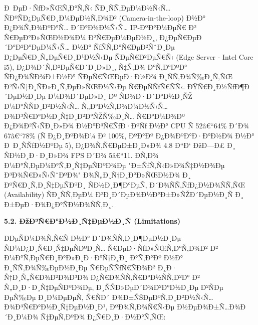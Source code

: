 \documentclass[]{article}
\begin{document}
Ð ÐµÐ·ÑƒÐ»ÑŒÑ‚Ð°Ñ‚Ñ‹ ÑÐ¸ÑÑ‚ÐµÐ¼Ð½Ñ‹Ñ… ÑÐºÑÐ¿ÐµÑ€Ð¸Ð¼ÐµÐ½Ñ‚Ð¾Ð² (Camera-in-the-loop) Ð½Ð° Ð¿Ð¾Ñ‚Ð¾ÐºÐ°Ñ… Ð´Ð°Ð½Ð½Ñ‹Ñ… IP-ÐºÐ°Ð¼ÐµÑ€ Ð² Ñ€ÐµÐ°Ð»ÑŒÐ½Ð¾Ð¼ Ð²Ñ€ÐµÐ¼ÐµÐ½Ð¸, Ð¿ÐµÑ€ÐµÐ´Ð°Ð²Ð°ÐµÐ¼Ñ‹Ñ… Ð½Ð° ÑƒÑÑ‚Ð°Ñ€ÐµÐ²ÑˆÐ¸Ðµ Ð¿ÐµÑ€Ð¸Ñ„ÐµÑ€Ð¸Ð¹Ð½Ñ‹Ðµ ÑÐµÑ€Ð²ÐµÑ€Ñ‹ (Edge Server - Intel Core i5), Ð¿Ð¾Ð´Ñ‚Ð²ÐµÑ€Ð´Ð¸Ð»Ð¸, Ñ‡Ñ‚Ð¾ Ð°Ñ‚Ð°ÐºÐ° ÑÐ¿Ð¾ÑÐ¾Ð±Ð½Ð° ÑÐµÑ€ÑŒÐµÐ·Ð½Ð¾ Ð¸ÑÑ‚Ð¾Ñ‰Ð¸Ñ‚ÑŒ Ð²Ñ‹Ñ‡Ð¸ÑÐ»Ð¸Ñ‚ÐµÐ»ÑŒÐ½Ñ‹Ðµ Ñ€ÐµÑÑƒÑ€ÑÑ‹. ÐŸÑ€Ð¸Ð½ÑƒÐ¶Ð´ÐµÐ½Ð¸Ðµ Ð¼Ð¾Ð´ÐµÐ»Ð¸ Ðº ÑÐ¾Ð·Ð´Ð°Ð½Ð¸ÑŽ Ð¼Ð°ÑÑÐ¸Ð²Ð½Ñ‹Ñ… Ñ„Ð°Ð½Ñ‚Ð¾Ð¼Ð½Ñ‹Ñ… Ð¾Ð³Ñ€Ð°Ð½Ð¸Ñ‡Ð¸Ð²Ð°ÑŽÑ‰Ð¸Ñ… Ñ€Ð°Ð¼Ð¾Ðº Ð¿Ð¾Ð²Ñ‹ÑÐ¸Ð»Ð¾ Ð½Ð°Ð³Ñ€ÑƒÐ·ÐºÑƒ Ð½Ð° CPU Ñ 52â€“64\% Ð´Ð¾ 67â€“78\% (Ñ Ð¿Ð¸ÐºÐ¾Ð¼ Ð² 100\%, ÐºÐ°Ðº Ð¿Ð¾ÐºÐ°Ð·Ð°Ð½Ð¾ Ð½Ð° Ð Ð¸ÑÑƒÐ½ÐºÐµ 5), Ð¿Ð¾Ñ‚Ñ€ÐµÐ±Ð¸Ð»Ð¾ 4.8 Ð“Ð‘ ÐžÐ—Ð£ Ð¸ ÑÐ½Ð¸Ð·Ð¸Ð»Ð¾ FPS Ð´Ð¾ 5â€“11. Ð­Ñ‚Ð¾ Ð¼Ð°Ñ‚ÐµÐ¼Ð°Ñ‚Ð¸Ñ‡ÐµÑÐºÐ¾Ðµ "Ð±ÑƒÑ‚Ñ‹Ð»Ð¾Ñ‡Ð½Ð¾Ðµ Ð³Ð¾Ñ€Ð»Ñ‹ÑˆÐºÐ¾" Ð¾Ñ„Ð¸Ñ†Ð¸Ð°Ð»ÑŒÐ½Ð¾ Ð¸ ÐºÑ€Ð¸Ñ‚Ð¸Ñ‡ÐµÑÐºÐ¸ ÑÐ½Ð¸Ð¶Ð°ÐµÑ‚ Ð´Ð¾ÑÑ‚ÑƒÐ¿Ð½Ð¾ÑÑ‚ÑŒ (Availability) ÑÐ¸ÑÑ‚ÐµÐ¼ Ð²Ð¸Ð´ÐµÐ¾Ð½Ð°Ð±Ð»ÑŽÐ´ÐµÐ½Ð¸Ñ Ð¸ Ð±ÐµÐ·Ð¾Ð¿Ð°ÑÐ½Ð¾ÑÑ‚Ð¸.

\textbf{5.2. ÐžÐ³Ñ€Ð°Ð½Ð¸Ñ‡ÐµÐ½Ð¸Ñ (Limitations)}

ÐÐµÑÐ¼Ð¾Ñ‚Ñ€Ñ Ð½Ð° Ð´Ð¾ÑÑ‚Ð¸Ð¶ÐµÐ½Ð¸Ðµ ÑÐ¼Ð¿Ð¸Ñ€Ð¸Ñ‡ÐµÑÐºÐ¸Ñ… Ñ€ÐµÐ·ÑƒÐ»ÑŒÑ‚Ð°Ñ‚Ð¾Ð² Ð² Ð¼Ð°Ñ‚ÐµÑ€Ð¸Ð°Ð»Ð¸Ð·Ð°Ñ†Ð¸Ð¸ Ð°Ñ‚Ð°Ðº Ð½Ð° Ð¸ÑÑ‚Ð¾Ñ‰ÐµÐ½Ð¸Ðµ Ñ€ÐµÑÑƒÑ€ÑÐ¾Ð² Ð¸Ð· Ñ†Ð¸Ñ„Ñ€Ð¾Ð²Ð¾Ð³Ð¾ Ð¿Ñ€Ð¾ÑÑ‚Ñ€Ð°Ð½ÑÑ‚Ð²Ð° Ð² Ñ„Ð¸Ð·Ð¸Ñ‡ÐµÑÐºÐ¾Ðµ, Ð¸ÑÑÐ»ÐµÐ´Ð¾Ð²Ð°Ð½Ð¸Ðµ Ð²ÑÐµ ÐµÑ‰Ðµ Ð¸Ð¼ÐµÐµÑ‚ Ñ€ÑÐ´ Ð¾Ð±ÑŠÐµÐºÑ‚Ð¸Ð²Ð½Ñ‹Ñ… Ð¾Ð³Ñ€Ð°Ð½Ð¸Ñ‡ÐµÐ½Ð¸Ð¹, ÐºÐ¾Ñ‚Ð¾Ñ€Ñ‹Ðµ Ð½ÐµÐ¾Ð±Ñ…Ð¾Ð´Ð¸Ð¼Ð¾ Ñ‡ÐµÑ‚ÐºÐ¾ Ð¿Ñ€Ð¸Ð·Ð½Ð°Ñ‚ÑŒ:
\end{document}
